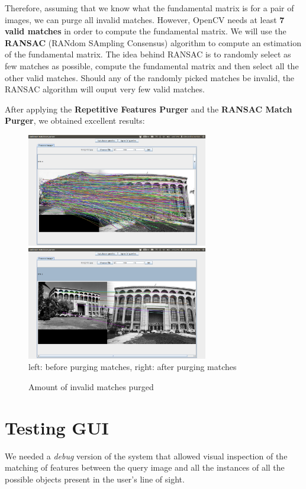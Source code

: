 \documentclass[a4paper,onecolumn,oneside,titlepage,11pt]{report}
\begin{document}
Therefore, assuming that we know what the fundamental matrix is for a pair of images, we can purge all invalid matches. However, OpenCV needs at least \textbf{7 valid matches} in order to compute the fundamental matrix. We will use the \textbf{RANSAC} (RANdom SAmpling Consensus) algorithm to compute an estimation of the fundamental matrix. The idea behind RANSAC is to randomly select as few matches as possible, compute the fundamental matrix and then select all the other valid matches. Should any of the randomly picked matches be invalid, the RANSAC algorithm will ouput very few valid matches.

\vspace{1cm}

After applying the \textbf{Repetitive Features Purger} and the \textbf{RANSAC Match Purger}, we obtained excellent results:

\begin{figure}[H]
\begin{center}
\includegraphics[width=7.9cm]{../../images/matches_before_purge.png}
\includegraphics[width=7.9cm]{../../images/matches_after_purge.png}\\
left: before purging matches, right: after purging matches
\caption{Amount of invalid matches purged}
\end{center}
\end{figure}

\section{Testing GUI}
We needed a \emph{debug} version of the system that allowed visual inspection of the matching of features between the query image and all the instances of all the possible objects present in the user's line of sight.
\end{document}
